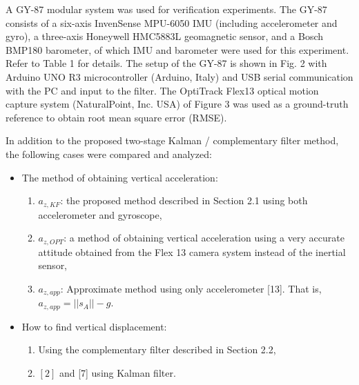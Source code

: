 \documentclass[10pt,journal,compsoc]{IEEEtran}
\begin{document}
A GY-87 modular system was used for verification experiments. The GY-87
consists of a six-axis InvenSense MPU-6050 IMU (including accelerometer and
gyro), a three-axis Honeywell HMC5883L geomagnetic sensor, and a Bosch BMP180
barometer, of which IMU and barometer were used for this experiment. Refer to
Table 1 for details.  The setup of the GY-87 is shown in Fig. 2 with Arduino
UNO R3 microcontroller (Arduino, Italy) and USB serial communication with the
PC and input to the filter.  The OptiTrack Flex13 optical motion capture system
(NaturalPoint, Inc. USA) of Figure 3 was used as a ground-truth reference to obtain
root mean square error (RMSE).  

In addition to the proposed two-stage Kalman / complementary filter method,
the following cases were compared and analyzed:

\begin{itemize}
\item The method of obtaining vertical acceleration: 
\begin{enumerate}
\item $a_{z,KF}$: the proposed method described in Section 2.1 using both accelerometer and gyroscope,
\item $a_{z,OPT}$: a method of obtaining vertical acceleration using a very accurate attitude obtained from the 
  Flex 13 camera system instead of the inertial sensor,
\item $a_{z,app}$: Approximate method using only accelerometer [13]. That is, $a_{z,app} = ||s_A|| - g$.
\end{enumerate}
\item How to find vertical displacement:
\begin{enumerate}
\item Using the complementary filter described in Section 2.2,
\item $[2]$ and [7] using Kalman filter.
\end{enumerate}
\end{itemize}
\end{document}
